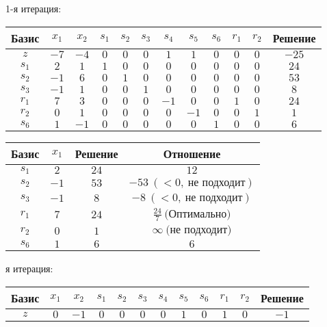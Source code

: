 \documentclass{article}%
\begin{document}
\begin{flushleft}%
1{-}я итерация: %
\newline%
\newline%
\renewcommand{\arraystretch}{1.3}%
\begin{tabular}{|c|cccccccccc|c|}%
\hline%
Базис&$x_{1}$&$x_{2}$&$s_{1}$&$s_{2}$&$s_{3}$&$s_{4}$&$s_{5}$&$s_{6}$&$r_{1}$&$r_{2}$&Решение\\%
\hline%
$z$&$-7$&$-4$&$0$&$0$&$0$&$1$&$1$&$0$&$0$&$0$&$-25$\\%
\hline%
$s_{1}$&$2$&$1$&$1$&$0$&$0$&$0$&$0$&$0$&$0$&$0$&$24$\\%
$s_{2}$&$-1$&$6$&$0$&$1$&$0$&$0$&$0$&$0$&$0$&$0$&$53$\\%
$s_{3}$&$-1$&$1$&$0$&$0$&$1$&$0$&$0$&$0$&$0$&$0$&$8$\\%
$r_{1}$&$7$&$3$&$0$&$0$&$0$&$-1$&$0$&$0$&$1$&$0$&$24$\\%
$r_{2}$&$0$&$1$&$0$&$0$&$0$&$0$&$-1$&$0$&$0$&$1$&$1$\\%
$s_{6}$&$1$&$-1$&$0$&$0$&$0$&$0$&$0$&$1$&$0$&$0$&$6$\\%
\hline%
\end{tabular}%
\newline%
\newline%
\newline%
\begin{tabular}{|cccc|}%
\hline%
Базис&$x_{1}$&Решение&Отношение\\%
\hline%
$s_{1}$&$2$&$24$&$12$\\%
$s_{2}$&$-1$&$53$&$-53\: (< 0, \: \text{не подходит})$\\%
$s_{3}$&$-1$&$8$&$-8\: (< 0, \: \text{не подходит})$\\%
$r_{1}$&$7$&$24$&$\frac{24}{7}\: \text{(Оптимально)}$\\%
$r_{2}$&$0$&$1$&$\infty \: \text{(не подходит)}$\\%
$s_{6}$&$1$&$6$&$6$\\%
\hline%
\end{tabular}%
\newline%
\newline%
я итерация: %
\newline%
\newline%
\renewcommand{\arraystretch}{1.3}%
\begin{tabular}{|c|cccccccccc|c|}%
\hline%
Базис&$x_{1}$&$x_{2}$&$s_{1}$&$s_{2}$&$s_{3}$&$s_{4}$&$s_{5}$&$s_{6}$&$r_{1}$&$r_{2}$&Решение\\%
\hline%
$z$&$0$&$-1$&$0$&$0$&$0$&$0$&$1$&$0$&$1$&$0$&$-1$\\%

\end{tabular}
\end{flushleft}
\end{document}
